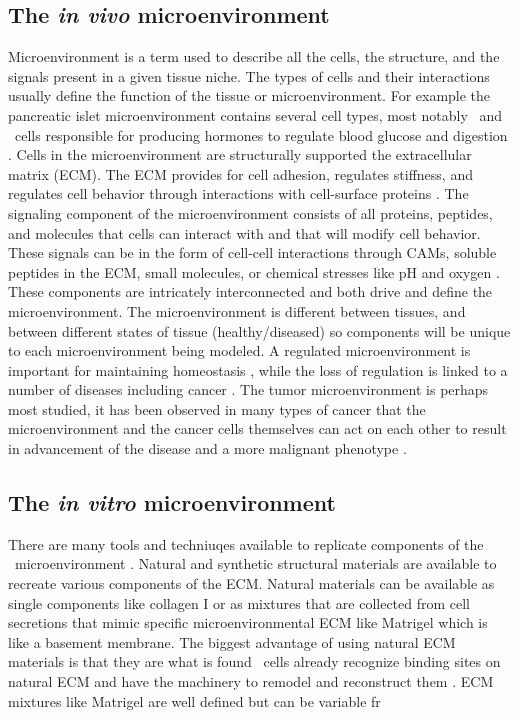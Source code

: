 \subsection{The \textit{in vivo} microenvironment}
Microenvironment is a term used to describe all the cells, the structure, and the signals present in a given tissue niche. The types of cells and their interactions usually define the function of the tissue or microenvironment. For example the pancreatic islet microenvironment contains several cell types, most notably \textalpha \ and \textbeta \ cells responsible for producing hormones to regulate blood glucose and digestion \cite{Cabrera2006TheFunction.}. Cells in the microenvironment are structurally supported the extracellular matrix (ECM). The ECM provides for cell adhesion, regulates stiffness, and regulates cell behavior through interactions with cell-surface proteins \cite{Stamenkovic2003ExtracellularMetalloproteinases, Meredith1993TheFactor.}. The signaling component of the microenvironment consists of all proteins, peptides, and molecules that cells can interact with and that will modify cell behavior. These signals can be in the form of cell-cell interactions through CAMs, soluble peptides in the ECM, small molecules, or chemical stresses like pH and oxygen \cite{Kim2011ExtracellularReceptor.}. These components are intricately interconnected and both drive and define the microenvironment.
The microenvironment is different between tissues, and between different states of tissue (healthy/diseased) so components will be unique to each microenvironment being modeled. A regulated microenvironment is important for maintaining homeostasis \cite{Nie2013Microenvironment-dependentRepair}, while the loss of regulation is linked to a number of diseases including cancer \cite{Malizia1985TheLymphocytes., Yip2011TheDisease, medema2011microenvironmental, Charbord1996EarlyMicroenvironment., Martin1995, Nie2013Microenvironment-dependentRepair}. The tumor microenvironment is perhaps most studied, it has been observed in many types of cancer that the microenvironment and the cancer cells themselves can act on each other to result in advancement of the disease and a more malignant phenotype \cite{Meads2008, Jun2006, Shain2001CellMDR., Seo2015}.

\subsection{The \textit{in vitro} microenvironment}
There are many tools and techniuqes available to replicate components of the \invivo\ microenvironment \invitro. Natural and synthetic structural materials are available to recreate various components of the ECM. Natural materials can be available as single components like collagen I or as mixtures that are collected from cell secretions that mimic specific microenvironmental ECM like Matrigel which is like a basement membrane. The biggest advantage of using natural ECM materials is that they are what is found \invivo\ cells already recognize binding sites on natural ECM and have the machinery to remodel and reconstruct them \cite{Mano2007NaturalTrends.}. ECM mixtures like Matrigel are well defined but can be variable fr


